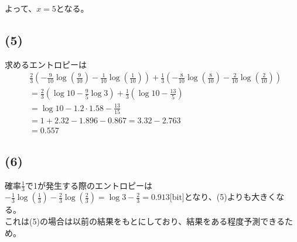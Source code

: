 \documentclass[a4paper,12pt,xelatex,ja=standard]{bxjsarticle}
\begin{document}
よって、$x=5$となる。

\subsection*{(5)}
求めるエントロピーは
\begin{equation*}
  \begin{split}
    &\frac{2}{3}\left(-\frac{9}{10} \log (\frac{9}{10}) - \frac{1}{10} \log (\frac{1}{10})\right) + \frac{1}{3}\left(-\frac{8}{10} \log (\frac{8}{10}) - \frac{2}{10} \log (\frac{2}{10})\right) \\
      &= \frac{2}{3}(\log 10 - \frac{9}{5} \log 3) + \frac{1}{3}(\log 10 - \frac{13}{5})\\
      &= \log 10 - 1.2 \cdot 1.58 - \frac{13}{15} \\
      &= 1 + 2.32 - 1.896 - 0.867 = 3.32 - 2.763 \\
      &= 0.557
  \end{split}
\end{equation*}

\subsection*{(6)}
確率$\frac{1}{3}$で1が発生する際のエントロピーは$- \frac{1}{3} \log (\frac{1}{3}) - \frac{2}{3} \log (\frac{2}{3}) = \log 3 - \frac{2}{3} = 0.913 \text{[bit]}$となり、(5)よりも大きくなる。\\
これは(5)の場合は以前の結果をもとにしており、結果をある程度予測できるため。
\end{document}
